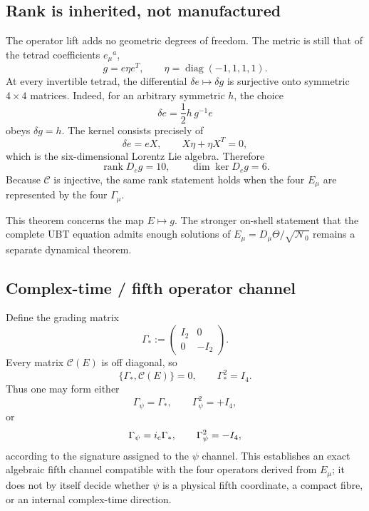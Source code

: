 \subsection{Rank is inherited, not manufactured}
The operator lift adds no geometric degrees of freedom.  The metric is still
that of the tetrad coefficients $e_\mu{}^a$,
\begin{equation}
 g=e\eta e^T,
 \qquad \eta=\operatorname{diag}(-1,1,1,1).
\end{equation}
At every invertible tetrad, the differential
$\delta e\mapsto\delta g$ is surjective onto symmetric $4\times4$ matrices.
Indeed, for an arbitrary symmetric $h$, the choice
\begin{equation}
 \delta e=\frac12h\,g^{-1}e
 \label{eq:canonical:tetrad-right-inverse}
\end{equation}
obeys $\delta g=h$.  The kernel consists precisely of
\begin{equation}
 \delta e=eX,
 \qquad X\eta+\eta X^T=0,
\end{equation}
which is the six-dimensional Lorentz Lie algebra.  Therefore
\begin{equation}
 \boxed{\operatorname{rank}D_e g=10,\qquad\dim\ker D_e g=6.}
\end{equation}
Because $\mathcal C$ is injective, the same rank statement holds when the four
$E_\mu$ are represented by the four $\Gamma_\mu$.

This theorem concerns the map $E\mapsto g$.  The stronger on-shell statement
that the complete UBT equation admits enough solutions of
$E_\mu=D_\mu\Theta/\sqrt{\mathcal N_0}$ remains a separate dynamical theorem.

\subsection{Complex-time / fifth operator channel}
Define the grading matrix
\begin{equation}
 \Gamma_*:=
 \begin{pmatrix}I_2&0\\0&-I_2\end{pmatrix}.
\end{equation}
Every matrix $\mathcal C(E)$ is off diagonal, so
\begin{equation}
 \{\Gamma_*,\mathcal C(E)\}=0,
 \qquad \Gamma_*^2=I_4.
 \label{eq:canonical:grading-anticommutation}
\end{equation}
Thus one may form either
\begin{equation}
 \Gamma_\psi=\Gamma_*,\qquad \Gamma_\psi^2=+I_4,
\end{equation}
or
\begin{equation}
 \Gamma_\psi=i_{\rm c}\Gamma_*,\qquad \Gamma_\psi^2=-I_4,
\end{equation}
according to the signature assigned to the $\psi$ channel.  This establishes
an exact algebraic fifth channel compatible with the four operators derived
from $E_\mu$; it does not by itself decide whether $\psi$ is a physical fifth
coordinate, a compact fibre, or an internal complex-time direction.


